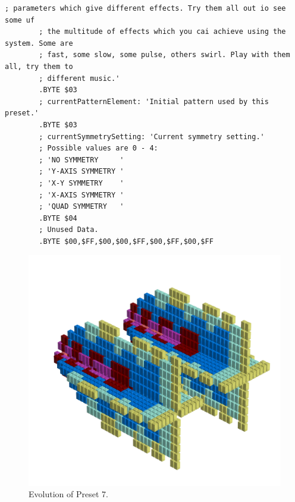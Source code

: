 \begin{lstlisting}[basicstyle=\ttfamily\tiny,caption=Source code for Preset 6.]
        ; parameters which give different effects. Try them all out io see some uf
        ; the multitude of effects which you cai achieve using the system. Some are
        ; fast, some slow, some pulse, others swirl. Play with them all, try them to
        ; different music.'
        .BYTE $03
        ; currentPatternElement: 'Initial pattern used by this preset.'
        .BYTE $03
        ; currentSymmetrySetting: 'Current symmetry setting.'
        ; Possible values are 0 - 4:
        ; 'NO SYMMETRY     '
        ; 'Y-AXIS SYMMETRY '
        ; 'X-Y SYMMETRY    '
        ; 'X-AXIS SYMMETRY '
        ; 'QUAD SYMMETRY   '
        .BYTE $04
        ; Unused Data.
        .BYTE $00,$FF,$00,$00,$FF,$00,$FF,$00,$FF
\end{lstlisting}


\clearpage                                                                 
\begin{figure}[H]                                                          
    \centering                                                             
    \begin{adjustbox}{width=14cm,center}                                   
      \includegraphics[width=14cm]{src/presets/pattern7-45.png}%
    \end{adjustbox}                                                        
\caption{Evolution of Preset 7.}                                           
\end{figure}                                                               
\clearpage                                                                 
                                                                           
